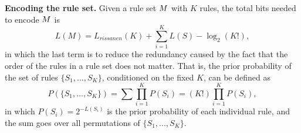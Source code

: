 \noindent \textbf{Encoding the rule set. }
Given a rule set $M$ with $K$ rules, the total bits needed to encode $M$ is 
\begin{equation}
	L(M) = L_{rissanen}(K) + \sum_{i = 1}^K L(S) - \log_2(K!), 
\end{equation}
in which the last term is to reduce the redundancy caused by the fact that the order of the rules in a rule set does not matter. That is, the prior probability of the set of rules $\{S_1, ..., S_K\}$, conditioned on the fixed $K$, can be defined as 
\begin{equation}
	P(\{S_1, ..., S_K\}) = \sum \prod_{i = 1}^K P(S_i) = (K!) \prod_{i = 1}^K P(S_i), 
\end{equation}
in which $P(S_i) = 2^{-L(S_i)}$ is the prior probability of each individual rule, and the sum goes over all permutations of $\{S_1, ..., S_K\}$. 


% 
 
